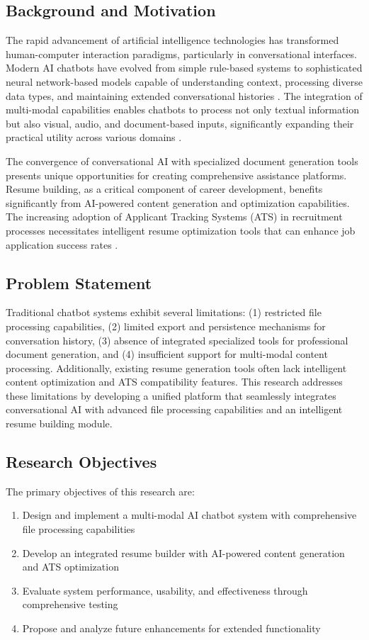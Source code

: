 \documentclass[conference]{IEEEtran}
\begin{document}
\subsection{Background and Motivation}
The rapid advancement of artificial intelligence technologies has transformed human-computer interaction paradigms, particularly in conversational interfaces. Modern AI chatbots have evolved from simple rule-based systems to sophisticated neural network-based models capable of understanding context, processing diverse data types, and maintaining extended conversational histories \cite{adamopoulou2020}. The integration of multi-modal capabilities enables chatbots to process not only textual information but also visual, audio, and document-based inputs, significantly expanding their practical utility across various domains \cite{radford2021}.

The convergence of conversational AI with specialized document generation tools presents unique opportunities for creating comprehensive assistance platforms. Resume building, as a critical component of career development, benefits significantly from AI-powered content generation and optimization capabilities. The increasing adoption of Applicant Tracking Systems (ATS) in recruitment processes necessitates intelligent resume optimization tools that can enhance job application success rates \cite{black2020}.

\subsection{Problem Statement}
Traditional chatbot systems exhibit several limitations: (1) restricted file processing capabilities, (2) limited export and persistence mechanisms for conversation history, (3) absence of integrated specialized tools for professional document generation, and (4) insufficient support for multi-modal content processing. Additionally, existing resume generation tools often lack intelligent content optimization and ATS compatibility features. This research addresses these limitations by developing a unified platform that seamlessly integrates conversational AI with advanced file processing capabilities and an intelligent resume building module.

\subsection{Research Objectives}
The primary objectives of this research are:
\begin{enumerate}[itemsep=0pt, parsep=0pt]
    \item Design and implement a multi-modal AI chatbot system with comprehensive file processing capabilities
    \item Develop an integrated resume builder with AI-powered content generation and ATS optimization
    \item Evaluate system performance, usability, and effectiveness through comprehensive testing
    \item Propose and analyze future enhancements for extended functionality
\end{enumerate}
\end{document}
